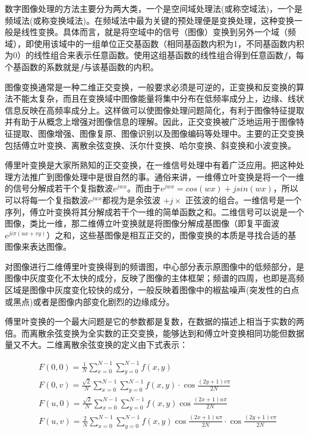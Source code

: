 
 \lettrine{数}{字}图像处理的方法主要分为两大类，一个是空间域处理法(或称空域法)，一个是频域法(或称变换域法)。在频域法中最为关键的预处理便是变换处理，这种变换一般是线性变换。具体而言，就是将空域中的信号（图像）变换到另外一个域（频域），即使用该域中的一组单位正交基函数（相同基函数内积为1，不同基函数内积为0）的线性组合来表示任意函数。使用这组基函数的线性组合得到任意函数$f$，每个基函数的系数就是$f$与该基函数的内积。

图像变换通常是一种二维正交变换，一般要求必须是可逆的，正变换和反变换的算法不能太复杂，而且在变换域中图像能量将集中分布在低频率成分上，边缘、线状信息反映在高频率成分上。这样做可以使图像处理问题简化，有利于图像特征提取并有助于从概念上增强对图像信息的理解。因此，正交变换被广泛地运用于图像特征提取、图像增强、图像复原、图像识别以及图像编码等处理中。主要的正交变换包括傅立叶变换、离散余弦变换、沃尔什变换、哈尔变换、斜变换和小波变换。

傅里叶变换是大家所熟知的正交变换，在一维信号处理中有着广泛应用。把这种处理方法推广到图像处理中是很自然的事。通俗来讲，一维傅立叶变换是将一个一维的信号分解成若干个复指数波$e^{jwx}$。而由于$e^{jwx} =cos(wx)+jsin(wx)$，所以可以将每一个复指数波$e^{jwx}$都视为是余弦波 $+ j\times$ 正弦波的组合。一维信号是一个序列，傅立叶变换将其分解成若干个一维的简单函数之和。二维信号可以说是一个图像，类比一维，那二维傅立叶变换就是将图像分解成基图像（即复平面波$e^{ji\pi (ux+vy)}$）之和，这些基图像是相互正交的，图像变换的本质是寻找合适的基图像来表达图像。

		对图像进行二维傅里叶变换得到的频谱图，中心部分表示原图像中的低频部分，是图像中灰度变化不太快的成分，反映了图像的主体框架；频谱的四周，也即是高频区域是图像中灰度变化较快的成分，一般反映着图像中的椒盐噪声(突发性的白点或黑点)或者是图像内部变化剧烈的边缘成分。
	
	傅里叶变换的一个最大问题是它的参数都是复数，在数据的描述上相当于实数的两倍。而离散余弦变换为全实数的正交变换，能够达到和傅立叶变换相同功能但数据量又不大。二维离散余弦变换的定义由下式表示：
	
\begin{equation}
\begin{aligned}
& F(0,0)=\frac{1}{N} \sum_{x=0}^{N-1} \sum_{y=0}^{N-1} f(x, y) \\
& F(0, v)=\frac{\sqrt{2}}{N} \sum_{x=0}^{N-1} \sum_{y=0}^{N-1} f(x, y) \cdot \cos \frac{(2 y+1) v \pi}{2 N} \\
& F(u, 0)=\frac{\sqrt{2}}{N} \sum_{x=0}^{N-1} \sum_{y=0}^{N-1} f(x, y) \cos \frac{(2 x+1) u \pi}{2 N} \\
& F(u, v)=\frac{2}{N} \sum_{x=0}^{N-1} \sum_{y=0}^{N-1} f(x, y) \cos \frac{(2 x+1) u \pi}{2 N} \cdot \cos \frac{(2 y+1) v \pi}{2 N}
\end{aligned}
\end{equation}


